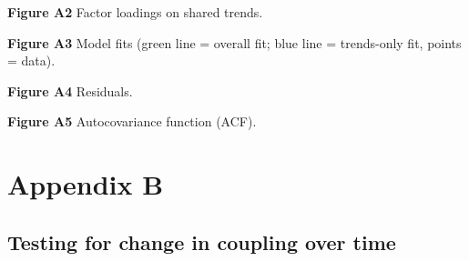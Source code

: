 \documentclass[notitlepage]{article}
\begin{document}
\begin{center}
\end{center}
\textbf{Figure A2} Factor loadings on shared trends.

\begin{center}

\end{center}
\textbf{Figure A3} Model fits (green line = overall fit; blue line = trends-only fit, points = data).

\begin{center}

\end{center}
\textbf{Figure A4} Residuals.

\begin{center}

\end{center}
\textbf{Figure A5} Autocovariance function (ACF).

\clearpage

\section*{Appendix B}

\subsection*{Testing for change in coupling over time}
\end{document}
